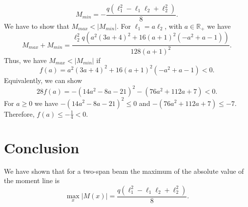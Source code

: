 \documentclass[a4paper]{article}
\newcommand{\R}{\mathbb{R}}
\begin{document}
\begin{equation}
    M_{min} = -\frac{q \left( \ell_{1}^{2} - \ell_{1} \ell_{2} + \ell_{2}^{2}\right)}{8}.
\end{equation}
We have to show that $M_{max} < |M_{min}|$. For $\ell_1 = a \ell_2$, with $a\in\R_+$ we have
\begin{equation}
    M_{max} + M_{min}  = \frac{\ell_{2}^{2} q \left(a^{2} \left(3 a + 4\right)^{2} + 16 \left(a + 1\right)^{2} \left(- a^{2} + a - 1\right)\right)}{128 \left(a + 1\right)^{2}}.
\end{equation}
Thus, we have $M_{max} < |M_{min}|$ if
\begin{equation}\label{eq::cond}
    f(a) = a^{2} \left(3 a + 4\right)^{2} + 16 \left(a + 1\right)^{2} \left(- a^{2} + a - 1\right) < 0.
\end{equation}
Equivalently, we can show
\begin{equation}\label{eq::cond}
    28 f(a) = -(14a^2-8a-21)^2 -(76a^2+112a+7) < 0.
\end{equation}
For $a\ge0$ we have $-(14a^2-8a-21)^2 \le 0$ and $-(76a^2+112a+7)\le-7$. Therefore, $f(a) \le -\frac{1}{4} < 0$.
\section*{Conclusion}
We have shown that for a two-span beam the maximum of the absolute value of the moment line is
\begin{equation}
    \max_{x}|M(x)| = \frac{q \left( \ell_{1}^{2} - \ell_{1} \ell_{2} + \ell_{2}^{2}\right)}{8}.
\end{equation}
\end{document}
